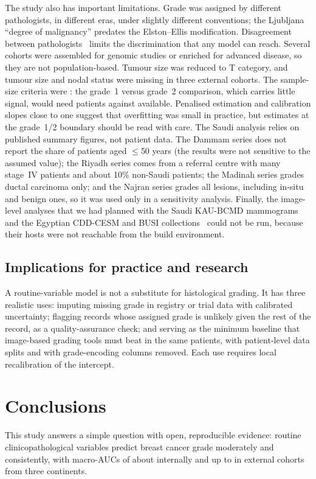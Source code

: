 The study also has important limitations. Grade was assigned by different pathologists, in different
eras, under slightly different conventions; the Ljubljana ``degree of malignancy'' predates the
Elston--Ellis modification. Disagreement between pathologists~\citep{boiesen2000grading,longacre2006interobserver}
limits the discrimination that any model can reach. Several cohorts were assembled for genomic
studies or enriched for advanced disease, so they are not population-based. Tumour size was reduced
to T category, and tumour size and nodal status were missing in three external cohorts. The
sample-size criteria were \SSMet: the grade~1 versus grade~2 comparison, which carries little signal,
would need \SSRequired{} patients against \SSAvailable{} available. Penalised estimation and
calibration slopes close to one suggest that overfitting was small in practice, but estimates at the
grade~1/2 boundary should be read with care. The Saudi analysis relies on published summary figures,
not patient data. The Dammam series does not report the share of patients aged $\le$50 years (the
results were not sensitive to the assumed value); the Riyadh series comes from a referral centre with
many stage~IV patients and about 10\% non-Saudi patients; the Madinah series grades ductal
carcinoma only; and the Najran series grades all lesions, including in-situ and benign ones, so it
was used only in a sensitivity analysis. \TabpfnLimitation{}Finally, the image-level analyses that
we had planned with the Saudi KAU-BCMD mammograms~\citep{alsolami2021kau} and the Egyptian CDD-CESM
and BUSI collections~\citep{khaled2022cddcesm,aldhabyani2020busi} could not be run, because their
hosts were not reachable from the build environment.

\subsection{Implications for practice and research}
A routine-variable model is not a substitute for histological grading. It has three realistic uses:
imputing missing grade in registry or trial data with calibrated uncertainty; flagging records whose
assigned grade is unlikely given the rest of the record, as a quality-assurance check; and serving as
the minimum baseline that image-based grading tools must beat in the same patients, with
patient-level data splits and with grade-encoding columns removed. Each use requires local
recalibration of the intercept.

\section{Conclusions}
This study answers a simple question with open, reproducible evidence: routine clinicopathological
variables predict breast cancer grade moderately and consistently, with macro-AUCs of about
\IntAucMaxR{} internally and up to \ExtAucMax{} in external cohorts from three continents.

